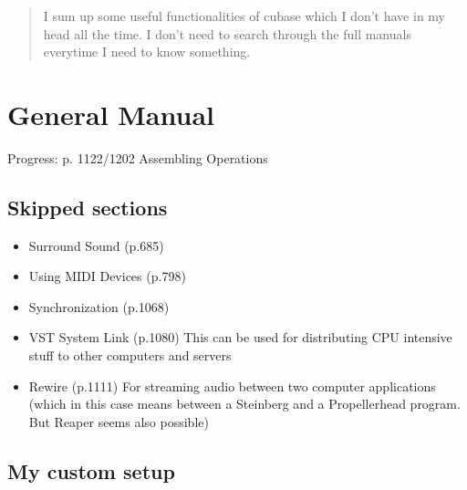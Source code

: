 \documentclass[10pt]{article}
\begin{document}
\maketitle
\newpage

\tableofcontents
\newpage

\begin{abstract}
I sum up some useful functionalities of cubase which I don't have in my head all the time. I don't need to search through the full manuals everytime I need to know something.
\end{abstract}

\section{General Manual}\label{GeneralManual}

Progress: p. 1122/1202 Assembling Operations

\subsection{Skipped sections}

\begin{itemize}
	\item Surround Sound (p.685)
	\item Using MIDI Devices (p.798)
	\item Synchronization (p.1068)
	\item VST System Link (p.1080) This can be used for distributing CPU intensive stuff to other computers and servers
	\item Rewire (p.1111) For streaming audio between two computer applications (which in this case means between a Steinberg and a Propellerhead program. But Reaper seems also possible)
\end{itemize}

\subsection{My custom setup}\hypertarget{CustomSetup}{}
\end{document}
